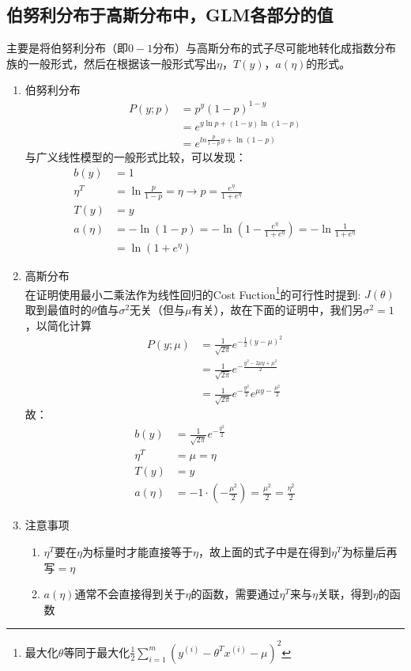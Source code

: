 \subsection{伯努利分布于高斯分布中，GLM各部分的值}
主要是将伯努利分布（即$0-1$分布）与高斯分布的式子尽可能地转化成指数分布族的一般形式，然后在根据该一般形式写出$\eta$，$T(y)$，$a(\eta)$的形式。\\
\begin{enumerate}
	\item 伯努利分布
	\begin{align}
		P(y;p) &= p^y(1-p)^{1-y} \\
		&= e^{y\ln p + (1-y)\ln(1-p)} \\
		&= e^{ln{\frac{p}{1-p}}y + \ln(1-p)}
	\end{align}
	与广义线性模型的一般形式比较，可以发现：
	\begin{align}
		b(y) &= 1 \\
		\eta^T &= \ln{\frac{p}{1-p}} = \eta \rightarrow p = \frac{e^{\eta}}{1+e^{\eta}} \\
		T(y) &= y \\
		a(\eta) &= -\ln(1-p) = -\ln{(1-\frac{e^{\eta}}{1+e^{\eta}})} = -\ln{\frac{1}{1+e^\eta}} \\
		&= \ln(1+e^\eta)
	\end{align}

	\item 高斯分布 \\
	在证明使用最小二乘法作为线性回归的Cost Fuction\footnote{最大化$\theta$等同于最大化$\frac{1}{2} \sum_{i=1}^{m}\left(y^{(i)}-\theta^Tx^{(i)}-\mu\right)^2$}的可行性时提到: $J(\theta)$取到最值时的$\theta$值与$\sigma^2$无关（但与$\mu$有关），故在下面的证明中，我们另$\sigma^2=1$，以简化计算
	\begin{align}
		P(y;\mu) &= \frac{1}{\sqrt{2\pi}}e^{-\frac{1}{2}\left(y-\mu\right)^2} \\
		&= \frac{1}{\sqrt{2\pi}} e^{-\frac{y^2-2\mu y +\mu^2}{2}} \\
		&= \frac{1}{\sqrt{2\pi}}e^{-\frac{y^2}{2}} e^{\mu y-\frac{\mu^2}{2}}
	\end{align}
	故：
	\begin{align}
		b(y) &= \frac{1}{\sqrt{2\pi}}e^{-\frac{y^2}{2}} \\
		\eta^T &= \mu = \eta \\
		T(y) &= y \\
		a(\eta) &= -1\cdot (-\frac{\mu^2}{2}) = \frac{\mu^2}{2} = \frac{\eta^2}{2}
	\end{align}

	\item 注意事项
	\begin{enumerate}
		\item $\eta^T$要在$\eta$为标量时才能直接等于$\eta$，故上面的式子中是在得到$\eta^T$为标量后再写$=\eta$
		\item $a(\eta)$通常不会直接得到关于$\eta$的函数，需要通过$\eta^T$来与$\eta$关联，得到$\eta$的函数
	\end{enumerate}
\end{enumerate}

